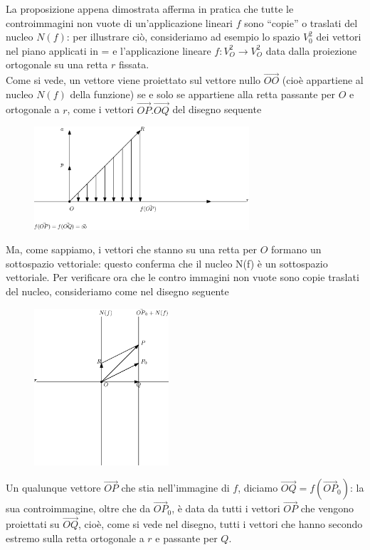 La proposizione appena dimostrata afferma in pratica che tutte le controimmagini non vuote
di un'applicazione lineari $f$ sono ``copie'' o traslati del nucleo $N(f)$: per illustrare ciò,
consideriamo ad esempio lo spazio $V_0^2$ dei vettori nel piano applicati in = e l'applicazione
lineare $f:V^2_O \to V^2_O$ data dalla proiezione ortogonale su una retta $r$ fissata.\\
Come si vede, un vettore viene proiettato sul vettore nullo $\vec{OO}$ (cioè appartiene al
nucleo $N(f)$ della funzione) se e solo se appartiene alla retta passante per $O$ e ortogonale
a $r$, come i vettori $\vec{OP}. \vec{OQ}$ del disegno sequente
\begin{figure}[th]
  \centering
  \includegraphics[width=8cm]{img/finiti/imgex4-4-5.eps}
\end{figure}

Ma, come sappiamo, i vettori che stanno su una retta per $O$ formano un sottospazio vettoriale:
questo conferma che il nucleo N(f) è un sottospazio vettoriale.
Per verificare ora che le contro immagini non vuote sono copie traslati del nucleo, consideriamo
come nel disegno seguente
\begin{figure}[th]
  \centering
  \includegraphics[width=5cm]{img/finiti/imgex4-4-6.eps}
\end{figure}

Un qualunque vettore $\vec{OP}$ che stia nell'immagine di $f$, diciamo $\vec{OQ}=f(\vec{OP}_0)$:
la sua controimmagine, oltre che da $\vec{OP}_0$, è data da tutti i vettori $\vec{OP}$ che
vengono proiettati su $\vec{OQ}$, cioè, come si vede nel disegno, tutti i vettori che hanno
secondo estremo sulla retta ortogonale a $r$ e passante per $Q$.
\clearpage
